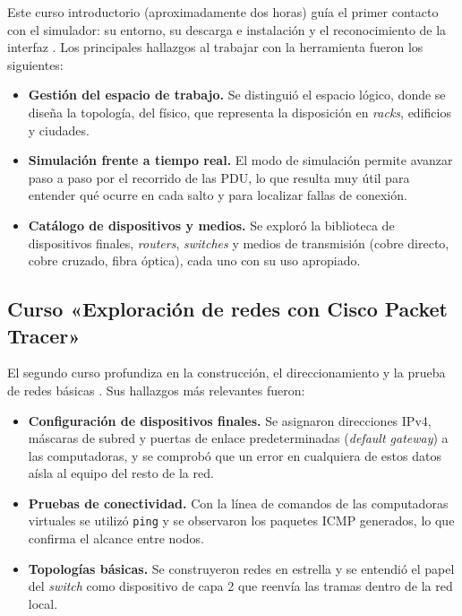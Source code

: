 Este curso introductorio (aproximadamente dos horas) guía el primer contacto con el simulador: su entorno, su descarga e instalación y el reconocimiento de la interfaz \cite{skillsforall:getting-started-pt:2026}. Los principales hallazgos al trabajar con la herramienta fueron los siguientes:

\begin{itemize}
    \item \textbf{Gestión del espacio de trabajo.} Se distinguió el espacio lógico, donde se diseña la topología, del físico, que representa la disposición en \emph{racks}, edificios y ciudades.
    \item \textbf{Simulación frente a tiempo real.} El modo de simulación permite avanzar paso a paso por el recorrido de las PDU, lo que resulta muy útil para entender qué ocurre en cada salto y para localizar fallas de conexión.
    \item \textbf{Catálogo de dispositivos y medios.} Se exploró la biblioteca de dispositivos finales, \emph{routers}, \emph{switches} y medios de transmisión (cobre directo, cobre cruzado, fibra óptica), cada uno con su uso apropiado.
\end{itemize}

\subsection{Curso «Exploración de redes con Cisco Packet Tracer»}
\label{sec:prac04:curso-exploracion}

El segundo curso profundiza en la construcción, el direccionamiento y la prueba de redes básicas \cite{skillsforall:exploring-networking-pt:2026}. Sus hallazgos más relevantes fueron:

\begin{itemize}
    \item \textbf{Configuración de dispositivos finales.} Se asignaron direcciones IPv4, máscaras de subred y puertas de enlace predeterminadas (\emph{default gateway}) a las computadoras, y se comprobó que un error en cualquiera de estos datos aísla al equipo del resto de la red.
    \item \textbf{Pruebas de conectividad.} Con la línea de comandos de las computadoras virtuales se utilizó \texttt{ping} y se observaron los paquetes ICMP generados, lo que confirma el alcance entre nodos.
    \item \textbf{Topologías básicas.} Se construyeron redes en estrella y se entendió el papel del \emph{switch} como dispositivo de capa 2 que reenvía las tramas dentro de la red local.
\end{itemize}

